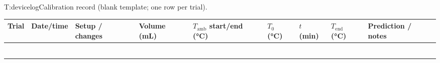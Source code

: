 \begin{reftab}{T:devicelog}{Calibration record (blank template; one row per trial).}
\small
\renewcommand{\arraystretch}{1.55}
\begin{tabularx}{\textwidth}{@{}|C{0.05\textwidth}|C{0.09\textwidth}|Y|C{0.08\textwidth}|C{0.11\textwidth}|C{0.07\textwidth}|C{0.07\textwidth}|C{0.07\textwidth}|C{0.13\textwidth}|@{}}
\hline
Trial & Date/time & Setup / changes & Volume (mL) & $T_{\text{amb}}$ start/end (\si{\celsius}) & $T_0$ (\si{\celsius}) & $t$ (min) & $T_{\text{end}}$ (\si{\celsius}) & Prediction / notes\\
\hline
 & & & & & & & & \\ \hline
 & & & & & & & & \\ \hline
 & & & & & & & & \\ \hline
 & & & & & & & & \\ \hline
 & & & & & & & & \\ \hline
 & & & & & & & & \\ \hline
\end{tabularx}\end{reftab}
